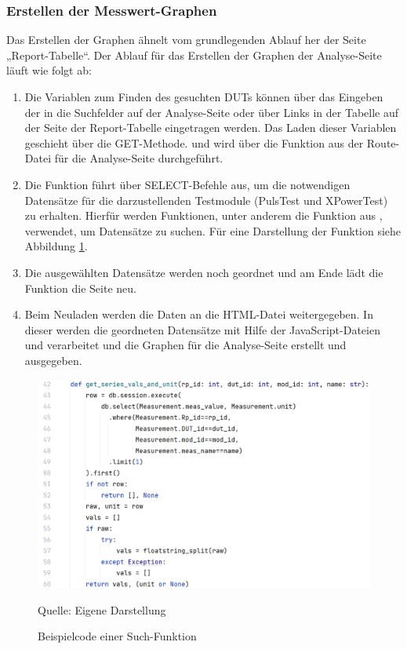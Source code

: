 \subsubsection{Erstellen der Messwert-Graphen}

Das Erstellen der Graphen ähnelt vom grundlegenden Ablauf her der Seite „Report-Tabelle“.
Der Ablauf für das Erstellen der Graphen der Analyse-Seite läuft wie folgt ab:

\begin{enumerate}

    \item Die Variablen zum Finden des gesuchten \ac{DUTs} können über das Eingeben der in die Suchfelder auf der Analyse-Seite
    oder über Links in der Tabelle auf der Seite der Report-Tabelle eingetragen werden.
    Das Laden dieser Variablen geschieht über die GET-Methode.
    und wird über die Funktion  aus der Route-Datei für die Analyse-Seite durchgeführt.
    \item Die Funktion  führt über  SELECT-Befehle aus, um die notwendigen Datensätze für die darzustellenden Testmodule (PulsTest und XPowerTest) zu erhalten.
    Hierfür werden Funktionen, unter anderem die Funktion  aus , verwendet, um Datensätze zu suchen.
    Für eine Darstellung der Funktion siehe Abbildung \ref{fig:Beispielcode einer Such-Funktion}.
    \item Die ausgewählten Datensätze werden noch geordnet und am Ende lädt die Funktion die Seite neu.
    \item Beim Neuladen werden die Daten an die HTML-Datei  weitergegeben.
    In dieser werden die geordneten Datensätze mit Hilfe der JavaScript-Dateien  und  verarbeitet und die Graphen für die Analyse-Seite erstellt und ausgegeben.

\end{enumerate}

\begin{figure}[H]
    \centering
    \includegraphics[width=1\textwidth]{Grafiken/get-series.png}
    \caption{Beispielcode einer Such-Funktion}
    \label{fig:Beispielcode einer Such-Funktion}
    {Quelle: Eigene Darstellung}
\end{figure}

